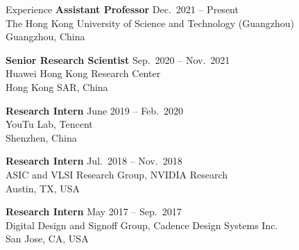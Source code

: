 
\begin{rSection}{Experience}
{\bf Assistant Professor}         \hfill { Dec.~2021 -- Present} \\
The Hong Kong University of Science and Technology (Guangzhou) \\
Guangzhou, China

{\bf Senior Research Scientist}         \hfill { Sep.~2020 -- Nov.~2021} \\
Huawei Hong Kong Research Center\\
Hong Kong SAR, China

{\bf Research Intern}         \hfill { June 2019 -- Feb.~2020} \\
YouTu Lab, Tencent\\
Shenzhen, China

{\bf Research Intern}               \hfill { Jul.~2018 -- Nov.~2018} \\
ASIC and VLSI Research Group, NVIDIA Research\\
Austin, TX, USA

{\bf Research Intern}               \hfill { May 2017 -- Sep.~2017} \\
Digital Design and Signoff Group, Cadence Design Systems Inc.\\
San Jose, CA, USA


\end{rSection}


